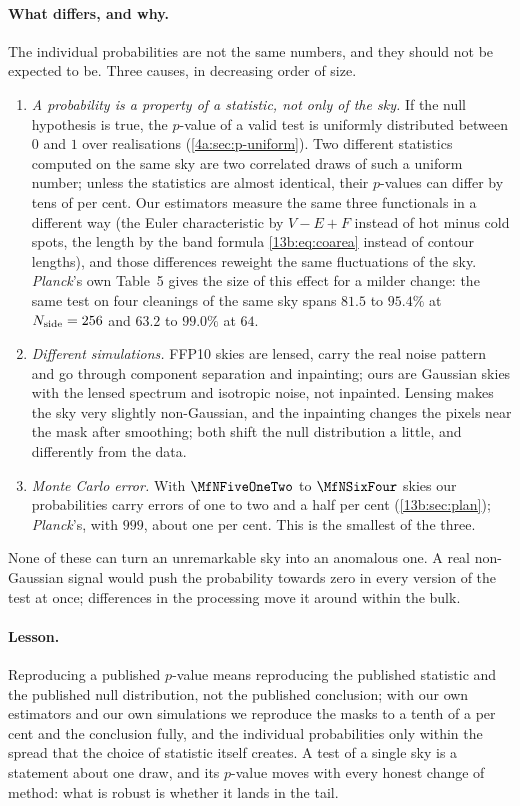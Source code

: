 \paragraph{What differs, and why.} The individual probabilities are not the same numbers, and they should not be
expected to be. Three causes, in decreasing order of size.
\begin{enumerate}[itemsep=2pt,leftmargin=1.5em]
  \item \emph{A probability is a property of a statistic, not only of the sky.} If the null hypothesis is true, the
        $p$-value of a valid test is uniformly distributed between $0$ and $1$ over realisations
        (\cref{4a:sec:p-uniform}). Two different statistics computed on the same sky are two correlated draws of
        such a uniform number; unless the statistics are almost identical, their $p$-values can differ by tens of per
        cent. Our estimators measure the same three functionals in a different way (the Euler characteristic by
        $V-E+F$ instead of hot minus cold spots, the length by the band formula \eqref{13b:eq:coarea} instead of
        contour lengths), and those differences reweight the same fluctuations of the sky. \textit{Planck}'s own Table~5
        gives the size of this effect for a milder change: the same test on four cleanings of the same sky spans
        $81.5$ to $95.4\%$ at $N_{\rm side}=256$ and $63.2$ to $99.0\%$ at $64$.
  \item \emph{Different simulations.} FFP10 skies are lensed, carry the real noise pattern and go through component
        separation and inpainting; ours are Gaussian skies with the lensed spectrum and isotropic noise, not inpainted.
        Lensing makes the sky very slightly non-Gaussian, and the inpainting changes the pixels near the mask after
        smoothing; both shift the null distribution a little, and differently from the data.
  \item \emph{Monte Carlo error.} With $\MfNFiveOneTwo$ to $\MfNSixFour$ skies our probabilities carry errors of one to
        two and a half per cent (\cref{13b:sec:plan}); \textit{Planck}'s, with $999$, about one per cent. This is the smallest of the
        three.
\end{enumerate}
None of these can turn an unremarkable sky into an anomalous one. A real non-Gaussian signal would push the probability
towards zero in every version of the test at once; differences in the processing move it around within the bulk.

\paragraph{Lesson.} Reproducing a published $p$-value means reproducing the published statistic and the published null
distribution, not the published conclusion; with our own estimators and our own simulations we reproduce the masks
to a tenth of a per cent and the conclusion fully, and the individual probabilities only within the spread that the choice of statistic
itself creates. A test of a single sky is a statement about one draw, and its $p$-value moves with every honest
change of method: what is robust is whether it lands in the tail.

